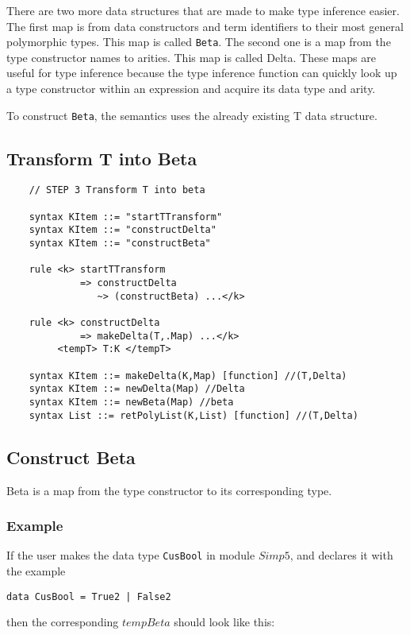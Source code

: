 There are two more data structures that are made to make type inference easier. The first map is from data constructors and term identifiers to their most general polymorphic types. This map is called \texttt{Beta}. The second one is a map from the type constructor names to arities. This map is called Delta. These maps are useful for type inference because the type inference function can quickly look up a type constructor within an expression and acquire its data type and arity.

To construct \texttt{Beta}, the semantics uses the already existing T data structure.

\subsection{Transform T into Beta}
\begin{lstlisting}
    // STEP 3 Transform T into beta

    syntax KItem ::= "startTTransform"
    syntax KItem ::= "constructDelta"
    syntax KItem ::= "constructBeta"

    rule <k> startTTransform
             => constructDelta
                ~> (constructBeta) ...</k>

    rule <k> constructDelta
             => makeDelta(T,.Map) ...</k>
         <tempT> T:K </tempT>

    syntax KItem ::= makeDelta(K,Map) [function] //(T,Delta)
    syntax KItem ::= newDelta(Map) //Delta
    syntax KItem ::= newBeta(Map) //beta
    syntax List ::= retPolyList(K,List) [function] //(T,Delta)
\end{lstlisting}

\subsection{Construct Beta}
Beta is a map from the type constructor to its corresponding type.

\subsubsection{Example}
If the user makes the data type \texttt{CusBool} in module $Simp5$, and declares it with the example
\begin{lstlisting}
data CusBool = True2 | False2
\end{lstlisting}

\noindent
then the corresponding $tempBeta$ should look like this:


